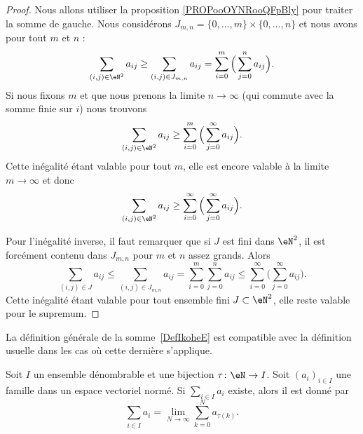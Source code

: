 \begin{proof}
	Nous allons utiliser la proposition \ref{PROPooOYNRooQFpBly} pour traiter la somme de gauche. Nous considérons \( J_{m,n}=\{ 0,\ldots, m \}\times \{ 0,\ldots, n \}\) et nous avons pour tout \( m\) et \( n\) :
	\begin{equation}
		\sum_{(i,j)\in \eN^2}a_{ij}\geq \sum_{(i,j)\in J_{m,n}}a_{ij}=\sum_{i=0}^m\Big( \sum_{j=0}^na_{ij} \Big).
	\end{equation}
	Si nous fixons \( m\) et que nous prenons la limite \( n\to \infty\) (qui commute avec la somme finie sur \( i\)) nous trouvons
	\begin{equation}
		\sum_{(i,j)\in \eN^2}a_{ij}\geq \sum_{i=0}^m\Big( \sum_{j=0}^{\infty}a_{ij} \Big).
	\end{equation}
	Cette inégalité étant valable pour tout \( m\), elle est encore valable à la limite \( m\to \infty\) et donc
	\begin{equation}
		\sum_{(i,j)\in \eN^2}a_{ij}\geq \sum_{i=0}^{\infty}\Big( \sum_{j=0}^{\infty}a_{ij} \Big).
	\end{equation}

	Pour l'inégalité inverse, il faut remarquer que si \( J\) est fini dans \( \eN^2\), il est forcément contenu dans \( J_{m,n}\) pour \( m\) et \( n\) assez grands. Alors
	\begin{equation}
		\sum_{(i,j)\in J}a_{ij}\leq \sum_{(i,j)\in J_{m,n}}a_{ij}=\sum_{i=0}^m\sum_{j=0}^na_{ij}\leq \sum_{i=0}^{\infty}\Big( \sum_{j=0}^{\infty}a_{ij} \Big).
	\end{equation}
	Cette inégalité étant valable pour tout ensemble fini \( J\subset \eN^2\), elle reste valable pour le supremum.
\end{proof}

La définition générale de la somme~\ref{DefIkoheE} est compatible avec la définition usuelle dans les cas où cette dernière s'applique.
\begin{proposition}\label{PropoWHdjw}
	Soit \( I\) un ensemble dénombrable et une bijection \( \tau\colon \eN\to I\). Soit \( (a_i)_{i\in I}\) une famille dans un espace vectoriel normé.  Si \( \sum_{i\in I}a_i\) existe, alors il est donné par
	\begin{equation}
		\sum_{i\in I}a_i=\lim_{N\to \infty} \sum_{k=0}^Na_{\tau(k)}.
	\end{equation}
\end{proposition}

